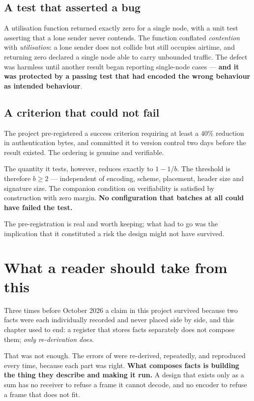 \subsection{A test that asserted a bug}

A utilisation function returned exactly zero for a single node, with a unit test asserting that a
lone sender never contends. The function conflated \emph{contention} with \emph{utilisation}: a lone
sender does not collide but still occupies airtime, and returning zero declared a single node able
to carry unbounded traffic. The defect was harmless until another result began reporting
single-node cases --- \textbf{and it was protected by a passing test that had encoded the wrong
behaviour as intended behaviour}.

\subsection{A criterion that could not fail}

The project pre-registered a success criterion requiring at least a $40\%$ reduction in
authentication bytes, and committed it to version control two days before the result existed. The
ordering is genuine and verifiable.

The quantity it tests, however, reduces exactly to $1 - 1/b$. The threshold is therefore
$b \geq 2$ --- independent of encoding, scheme, placement, header size and signature size. The
companion condition on verifiability is satisfied by construction with zero margin. \textbf{No
configuration that batches at all could have failed the test.}

The pre-registration is real and worth keeping; what had to go was the implication that it
constituted a risk the design might not have survived.

\section{What a reader should take from this}

Three times before October 2026 a claim in this project survived because two facts were each
individually recorded and never placed side by side, and this chapter used to end: a register
that stores facts separately does not compose them; \emph{only re-derivation does}.

That was not enough. The errors of  were re-derived, repeatedly, and reproduced
every time, because each part was right. \textbf{What composes facts is building the thing they
describe and making it run.} A design that exists only as a sum has no receiver to refuse a frame
it cannot decode, and no encoder to refuse a frame that does not fit.

